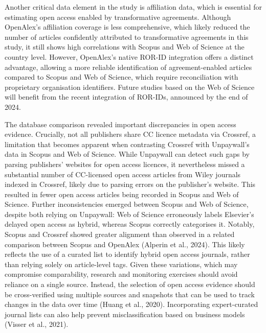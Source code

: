 \documentclass[a4paper,man,floatsintext,longtable,noextraspace,10pt]{apa6}
\begin{document}
Another critical data element in the study is affiliation data, which is
essential for estimating open access enabled by transformative
agreements. Although OpenAlex's affiliation coverage is less
comprehensive, which likely reduced the number of articles confidently
attributed to transformative agreements in this study, it still shows
high correlations with Scopus and Web of Science at the country level.
However, OpenAlex's native ROR-ID integration offers a distinct
advantage, allowing a more reliable identification of agreement-enabled
articles compared to Scopus and Web of Science, which require
reconciliation with proprietary organisation identifiers. Future studies
based on the Web of Science will benefit from the recent integration of
ROR-IDs, announced by the end of 2024.

The database comparison revealed important discrepancies in open access
evidence. Crucially, not all publishers share CC licence metadata via
Crossref, a limitation that becomes apparent when contrasting Crossref
with Unpaywall's data in Scopus and Web of Science. While Unpaywall can
detect such gaps by parsing publishers' websites for open access
licences, it nevertheless missed a substantial number of CC-licensed
open access articles from Wiley journals indexed in Crossref, likely due
to parsing errors on the publisher's website. This resulted in fewer
open access articles being recorded in Scopus and Web of Science.
Further inconsistencies emerged between Scopus and Web of Science,
despite both relying on Unpaywall: Web of Science erroneously labels
Elsevier's delayed open access as hybrid, whereas Scopus correctly
categorises it. Notably, Scopus and Crossref showed greater alignment
than observed in a related comparison between Scopus and OpenAlex
(Alperin et al., 2024). This likely reflects the use of a curated list
to identify hybrid open access journals, rather than relying solely on
article-level tags. Given these variations, which may compromise
comparability, research and monitoring exercises should avoid reliance
on a single source. Instead, the selection of open access evidence
should be cross-verified using multiple sources and snapshots that can
be used to track changes in the data over time (Huang et al., 2020).
Incorporating expert-curated journal lists can also help prevent
misclassification based on business models (Visser et al., 2021).
\end{document}
